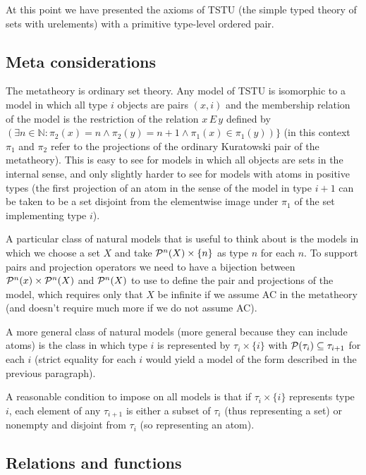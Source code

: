 \documentclass[12pt]{article}
\begin{document}
At this point we have presented the axioms of TSTU (the simple typed theory of sets with urelements) with a primitive type-level ordered pair.



\subsection{Meta considerations}

The metatheory is ordinary set theory.  Any model of TSTU is isomorphic to a model in which all type $i$ objects are pairs $(x,i)$ and the membership relation of the model is the
restriction of the relation $x \, E\, y$ defined by $(\exists n \in {\mathbb N}:\pi_2(x) = n \wedge \pi_2(y) = n+1 \wedge \pi_1(x) \in \pi_1(y))\}$ (in this context $\pi_1$ and $\pi_2$ refer to the projections of the ordinary Kuratowski pair of the metatheory).  This is easy to see for models in which all objects are sets in the internal sense, and only slightly harder to see for models with atoms in positive types (the first projection of an atom in the sense of the model in type $i+1$ can be taken to be a set disjoint from the elementwise image under $\pi_1$ of the set implementing type $i$).

A particular class of natural models that is useful to think about is the models in which we choose a set $X$ and take ${\cal P}^n(X) \times \{n\}$ as type $n$ for each $n$.  To support pairs and projection operators we need to have a bijection between ${\cal P}^n(x) \times {\cal P}^n(X)$ and ${\cal P}^n(X)$ to use to define the pair and projections of the model, which requires only that $X$ be infinite if we assume AC in the metatheory (and doesn't require much more if we do not assume AC).

A more general class of natural models (more general because they can include atoms) is the class in which type $i$ is represented by $\tau_i \times \{i\}$ with ${\cal P}(\tau_i) \subseteq \tau_{i+1}$ for each $i$ (strict equality for each $i$ would yield a model of the form described in the previous paragraph).

A reasonable condition to impose on all models is that if $\tau_i \times \{i\}$ represents type $i$, each element of any $\tau_{i+1}$ is either a subset of $\tau_i$ (thus representing a set) or nonempty and disjoint from $\tau_i$ (so representing an atom).

\subsection{Relations and functions}
\end{document}
